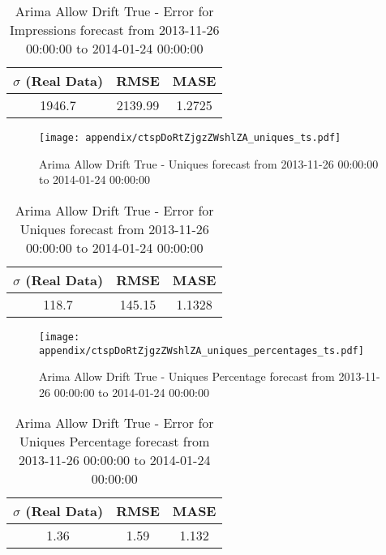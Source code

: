 \begin{table}[H]
\centering
\footnotesize
\begin{tabular}{ccc}
$\sigma$ (Real Data) & RMSE & MASE   \\ \hline
1946.7 & 2139.99 & 1.2725 \\
\end{tabular}

\vspace{0.5cm}

\caption[]{
Arima Allow Drift True - Error for Impressions forecast from 2013-11-26 00:00:00 to 2014-01-24 00:00:00}
\end{table}

\begin{figure}[H] \begin{center} \leavevmode
\texttt{[image: appendix/ctspDoRtZjgzZWshlZA\_uniques\_ts.pdf]} \caption[]{
Arima Allow Drift True - Uniques forecast from 2013-11-26 00:00:00 to 2014-01-24 00:00:00} \label{fig:appendix/ctspDoRtZjgzZWshlZA_uniques_ts.pdf} \end{center}
\end{figure}

\begin{table}[H]
\centering
\footnotesize
\begin{tabular}{ccc}
$\sigma$ (Real Data) & RMSE & MASE   \\ \hline
118.7 & 145.15 & 1.1328 \\
\end{tabular}

\vspace{0.5cm}

\caption[]{
Arima Allow Drift True - Error for Uniques forecast from 2013-11-26 00:00:00 to 2014-01-24 00:00:00}
\end{table}

\begin{figure}[H] \begin{center} \leavevmode
\texttt{[image: appendix/ctspDoRtZjgzZWshlZA\_uniques\_percentages\_ts.pdf]} \caption[]{
Arima Allow Drift True - Uniques Percentage forecast from 2013-11-26 00:00:00 to 2014-01-24 00:00:00} \label{fig:appendix/ctspDoRtZjgzZWshlZA_uniques_percentages_ts.pdf} \end{center}
\end{figure}

\begin{table}[H]
\centering
\footnotesize
\begin{tabular}{ccc}
$\sigma$ (Real Data) & RMSE & MASE   \\ \hline
1.36 & 1.59 & 1.132 \\
\end{tabular}

\vspace{0.5cm}

\caption[]{
Arima Allow Drift True - Error for Uniques Percentage forecast from 2013-11-26 00:00:00 to 2014-01-24 00:00:00}
\end{table}

